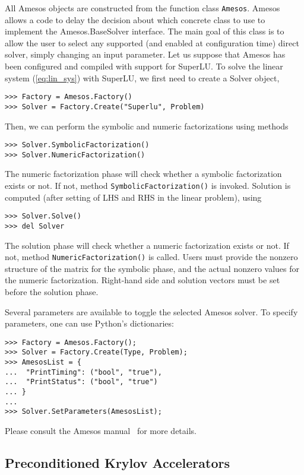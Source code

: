 \documentclass[10pt,relax]{SANDreport}
\begin{document}
All Amesos objects are constructed from the function class
\verb!Amesos!.  Amesos allows a code to delay the
decision about which concrete class to use to implement the
Amesos.BaseSolver interface. The main goal of this class is to allow
the user to select any supported (and enabled at configuration time)
direct solver, simply changing an input parameter. Let us suppose that Amesos
has been configured and compiled with support for SuperLU. To solve the linear
system (\ref{eq:lin_sys}) with SuperLU, we first need to create a Solver
object,
\begin{verbatim}
>>> Factory = Amesos.Factory()
>>> Solver = Factory.Create("Superlu", Problem)
\end{verbatim}
Then, we can perform the symbolic and numeric factorizations using methods
\begin{verbatim}
>>> Solver.SymbolicFactorization()
>>> Solver.NumericFactorization()
\end{verbatim}
The numeric factorization phase will check whether a symbolic
factorization exists or not. If not, method
\verb!SymbolicFactorization()! is invoked.  Solution is computed (after
setting of LHS and RHS in the linear problem), using
\begin{verbatim}
>>> Solver.Solve()
>>> del Solver
\end{verbatim}
The solution phase will check whether a numeric factorization exists or
not. If not, method \verb!NumericFactorization()! is called.
Users must provide the nonzero structure of the matrix for the symbolic
phase, and the actual nonzero values for the numeric
factorization. Right-hand side and solution vectors must be set before
the solution phase.
  
Several parameters are available to toggle the selected Amesos solver.
To specify parameters, one can use Python's dictionaries:
\begin{verbatim}
>>> Factory = Amesos.Factory();
>>> Solver = Factory.Create(Type, Problem);
>>> AmesosList = {
...  "PrintTiming": ("bool", "true"),
...  "PrintStatus": ("bool", "true")
... }
...
>>> Solver.SetParameters(AmesosList);
\end{verbatim}
Please consult the Amesos manual~\cite{Amesos-Reference-Guide} for more
details.

\subsection{Preconditioned Krylov Accelerators}
\label{sec:iterative}
\end{document}

